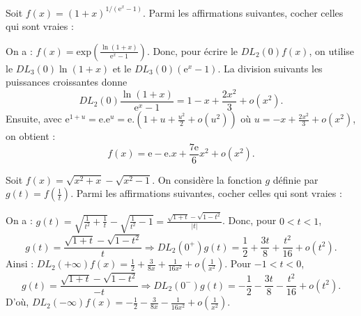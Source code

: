 \begin{question}
Soit $\displaystyle f(x)=(1+x)^{1/(\mathrm{e}^x-1)}$. Parmi les affirmations suivantes, cocher celles qui sont vraies :
\begin{answers}
\end{answers}
\vskip2mm
\begin{explanations}
On a : $\displaystyle f(x)=\mathrm{exp}\left(\frac{\ln (1+x)}{\mathrm{e}^x-1}\right)$. Donc, pour écrire le $\displaystyle DL_2(0)f(x)$, on utilise le $DL_3(0)\ln (1+x)$ et le $DL_3(0)(\mathrm{e}^x-1)$. La division suivants les puissances croissantes donne 
$$DL_2(0)\frac{\ln (1+x)}{\mathrm{e}^x-1}=1-x+\frac{2x^2}{3}+o(x^2).$$
Ensuite, avec $\displaystyle \mathrm{e}^{1+u}=\mathrm{e}.\mathrm{e}^u=\mathrm{e}.\left(1+u+\frac{u^2}{2}+o(u^2)\right)$ où $\displaystyle u=-x+\frac{2x^2}{3}+o(x^2)$, on obtient :
$$f(x)=\mathrm{e}-\mathrm{e}.x+\frac{7\mathrm{e}}{6}x^2+o(x^2).$$
\end{explanations}
\end{question}

\begin{question}
Soit $\displaystyle f(x)=\sqrt{x^2+x}-\sqrt{x^2-1}$. On considère la fonction $g$ définie par $\displaystyle g(t)=f\left(\frac{1}{t}\right)$. Parmi les affirmations suivantes, cocher celles qui sont vraies :
\begin{answers}  
\end{answers}
\vskip2mm
\begin{explanations}
On a : $\displaystyle g(t)=\sqrt{\frac{1}{t^2}+\frac{1}{t}}-\sqrt{\frac{1}{t^2}-1}=\frac{\sqrt{1+t}-\sqrt{1-t^2}}{|t|}$. Donc, pour $0<t<1$,
$$\displaystyle g(t)=\frac{\sqrt{1+t}-\sqrt{1-t^2}}{t}\Rightarrow DL_2(0^+)g(t)=\frac{1}{2}+\frac{3t}{8}+\frac{t^2}{16}+o(t^2).$$
Ainsi : $\displaystyle DL_2(+\infty)f(x)=\frac{1}{2}+\frac{3}{8x}+\frac{1}{16x^2}+o\left(\frac{1}{x^2}\right)$. Pour $-1<t<0$,
$$\displaystyle g(t)=\frac{\sqrt{1+t}-\sqrt{1-t^2}}{-t}\Rightarrow DL_2(0^-)g(t)=-\frac{1}{2}-\frac{3t}{8}-\frac{t^2}{16}+o(t^2).$$
D'où, $\displaystyle DL_2(-\infty)f(x)=-\frac{1}{2}-\frac{3}{8x}-\frac{1}{16x^2}+o\left(\frac{1}{x^2}\right)$.
\end{explanations}
\end{question}

